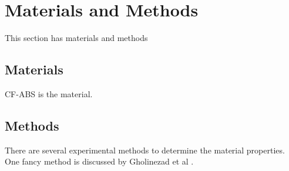 
\section{Materials and Methods}
This section has materials and methods
\subsection{Materials}
CF-ABS is the material.
\subsection{Methods}
There are several experimental methods to determine the material properties. One fancy method is discussed by Gholinezad et al \cite{gholinezhad2022non}.
